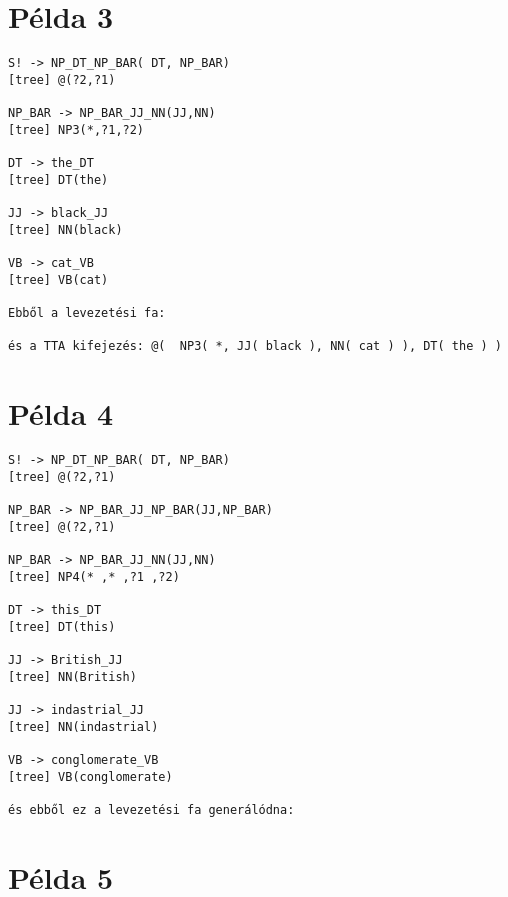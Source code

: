 \section{Példa 3}

\begin{verbatim}
S! -> NP_DT_NP_BAR( DT, NP_BAR)
[tree] @(?2,?1)

NP_BAR -> NP_BAR_JJ_NN(JJ,NN)
[tree] NP3(*,?1,?2)

DT -> the_DT
[tree] DT(the)

JJ -> black_JJ
[tree] NN(black)

VB -> cat_VB
[tree] VB(cat)

Ebből a levezetési fa:

és a TTA kifejezés: @(  NP3( *, JJ( black ), NN( cat ) ), DT( the ) )

\end{verbatim}



\section{Példa 4}

\begin{verbatim}
S! -> NP_DT_NP_BAR( DT, NP_BAR)
[tree] @(?2,?1)

NP_BAR -> NP_BAR_JJ_NP_BAR(JJ,NP_BAR)
[tree] @(?2,?1)

NP_BAR -> NP_BAR_JJ_NN(JJ,NN)
[tree] NP4(* ,* ,?1 ,?2)

DT -> this_DT
[tree] DT(this)

JJ -> British_JJ
[tree] NN(British)

JJ -> indastrial_JJ
[tree] NN(indastrial)

VB -> conglomerate_VB
[tree] VB(conglomerate)

és ebből ez a levezetési fa generálódna:

\end{verbatim}



\section{Példa 5}

